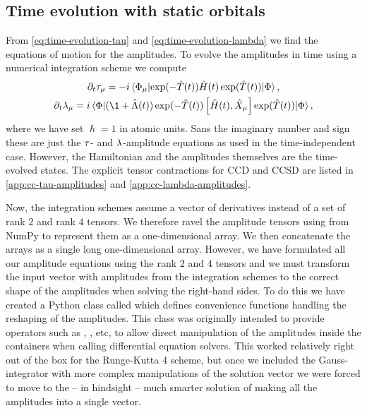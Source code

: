         \subsection{Time evolution with static orbitals}
            \label{subsec:tdcc-implementation}
            From \autoref{eq:time-evolution-tau} and
            \autoref{eq:time-evolution-lambda} we find the equations of motion
            for the amplitudes.
            To evolve the amplitudes in time using a numerical integration
            scheme we compute
            \begin{gather}
                \partial_t \clustamp_{\mu}
                = -i\mel*{\slat_{\mu}}{
                    \exponential(-\clust(t))
                    \hamil(t)
                    \exponential(\clust(t))
                }{\slat},
                \\
                \partial_t \clustlamp_{\mu}
                = i\mel*{\slat}{
                    (\1 + \clustl(t))
                    \exponential(-\clust(t))
                    \com{\hamil(t)}{\hat{X}_{\mu}}
                    \exponential(\clust(t))
                }{\slat},
            \end{gather}
            where we have set $\hslash = 1$ in atomic units.
            Sans the imaginary number and sign these are just the $\tau$-
            and $\lambda$-amplitude equations as used in the time-independent
            case.
            However, the Hamiltonian and the amplitudes themselves are the
            time-evolved states.
            The explicit tensor contractions for CCD and CCSD are listed in
            \autoref{app:cc-tau-amplitudes} and
            \autoref{app:cc-lambda-amplitudes}.

            Now, the integration schemes assume a vector of derivatives instead
            of a set of rank $2$ and rank $4$ tensors.
            We therefore ravel the amplitude tensors using  from
            NumPy to represent them as a one-dimensional array.
            We then concatenate the arrays as a single long one-dimensional
            array.
            However, we have formulated all our amplitude equations using the rank
            $2$ and $4$ tensors and we must transform the input vector with
            amplitudes from the integration schemes to the correct shape of the
            amplitudes when solving the right-hand sides.
            To do this we have created a Python class called
             which defines convenience functions
            handling the reshaping of the amplitudes.
            This class was originally intended to provide operators such as
            , , etc, to allow direct manipulation of
            the amplitudes inside the containers when calling differential
            equation solvers.
            This worked relatively right out of the box for the Runge-Kutta 4
            scheme, but once we included the Gauss-integrator with more complex
            manipulations of the solution vector we were forced to move to the
            -- in hindsight -- much smarter solution of making all the
            amplitudes into a single vector.

